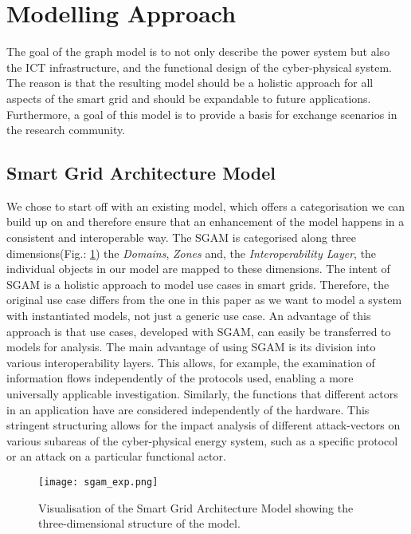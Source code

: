 \section{Modelling Approach}

The goal of the graph model is to not only describe the power system but also the \ac{ICT} infrastructure, and the functional design of the cyber-physical system.
The reason is that the resulting model should be a holistic approach for all aspects of the smart grid and should be expandable to future applications.
Furthermore, a goal of this model is to provide a basis for exchange scenarios in the research community.

\subsection{Smart Grid Architecture Model}
\label{subsec:sgam}

We chose to start off with an existing model, which offers a categorisation we can build up on and therefore ensure that an enhancement of the model happens in a consistent and interoperable way.
The \ac{SGAM} is categorised along three dimensions(Fig.: \ref{fig:sgam}) the \textit{Domains}, \textit{Zones} and, the \textit{Interoperability Layer}, the individual objects in our model are mapped to these dimensions\cite{sgam2012}.
The intent of \ac{SGAM} is a holistic approach to model use cases in smart grids.
Therefore, the original use case differs from the one in this paper as we want to model a system with instantiated models, not just a generic use case.
An advantage of this approach is that use cases, developed with \ac{SGAM}, can easily be transferred to models for analysis.
The main advantage of using \ac{SGAM} is its division into various interoperability layers.
This allows, for example, the examination of information flows independently of the protocols used, enabling a more universally applicable investigation. Similarly, the functions that different actors in an application have are considered independently of the hardware.
This stringent structuring allows for the impact analysis of different attack-vectors on various subareas of the cyber-physical energy system, such as a specific protocol or an attack on a particular functional actor.

\begin{figure}[H]
	\centering
	\texttt{[image: sgam\_exp.png]}
	\caption{
		Visualisation of the Smart Grid Architecture Model showing the three-dimensional structure of the model\protect\cite{sgam2012}.
	}
	\label{fig:sgam}
\end{figure}

